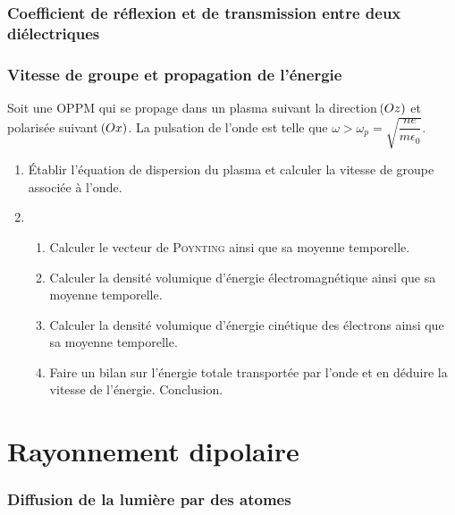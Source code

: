 \documentclass[a4paper,french,bookmarks]{book}
\begin{document}
    \subsection{Coefficient de réflexion et de transmission entre deux diélectriques}
    
    \subsection{Vitesse de groupe et propagation de l'énergie}
    
    Soit une OPPM qui se propage dans un plasma suivant la direction $\!\left(Oz\right)$ et polarisée suivant $\!\left(Ox\right)$. La pulsation de l'onde est telle que $\omega > \omega_p = \sqrt{\dfrac{ne}{m\epsilon_0}}$.
    
    \begin{enumerate}
        \item Établir l'équation de dispersion du plasma et calculer la vitesse de groupe associée à l'onde.
        
        \item \begin{enumerate}
            \item Calculer le vecteur de \textsc{Poynting} ainsi que sa moyenne temporelle.
            
            \item Calculer la densité volumique d'énergie électromagnétique ainsi que sa moyenne temporelle.
            
            \item Calculer la densité volumique d'énergie cinétique des électrons ainsi que sa moyenne temporelle.
            
            \item Faire un bilan sur l'énergie totale transportée par l'onde et en déduire la vitesse de l'énergie. Conclusion.
        \end{enumerate}
    \end{enumerate}
    
    \chapter{Rayonnement dipolaire}
    
    \subsection{Diffusion de la lumière par des atomes}
    
\end{document}
